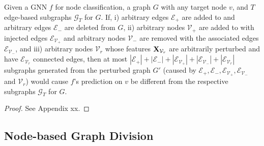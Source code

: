 \begin{theorem}
\label{thm:edgediff} 
Given a GNN $f$ for node classification, a graph $G$ with any target node $v$, and $T$ edge-based subgraphs $\mathcal{G}_T$ for $G$. 
If, i) arbitrary edges $\mathcal{E}_+$ are added to and arbitrary edges $\mathcal{E}_-$ are deleted from $G$, ii) arbitrary nodes $\mathcal{V}_+$ are added to with injected edges $\mathcal{E}_{\mathcal{V}_+}$ and arbitrary nodes $\mathcal{V}_-$ are removed with the associated edges $\mathcal{E}_{\mathcal{V}_-}$, and iii) arbitrary nodes $\mathcal{V}_{r}$ whose features ${\bf X}_{\mathcal{V}_{r}}$ are arbitrarily perturbed and have $\mathcal{E}_{\mathcal{V}_r}$ connected edges, then at most $|\mathcal{E}_+|+|\mathcal{E}_-| + |\mathcal{E}_{\mathcal{V}_+}| + |\mathcal{E}_{\mathcal{V}_-}| + |\mathcal{E}_{\mathcal{V}_r}|$ subgraphs generated from the perturbed graph $G'$ (caused by $\mathcal{E}_+, \mathcal{E}_-, \mathcal{E}_{\mathcal{V}_+}, \mathcal{E}_{\mathcal{V}_-}$ and $\mathcal{V}_r$) would cause $f$'s prediction on $v$ be different from the respective subgraphs $\mathcal{G}_T$ for $G$.  
\end{theorem}
\begin{proof}
See Appendix xx.  
\end{proof}






\subsection{Node-based Graph Division}







